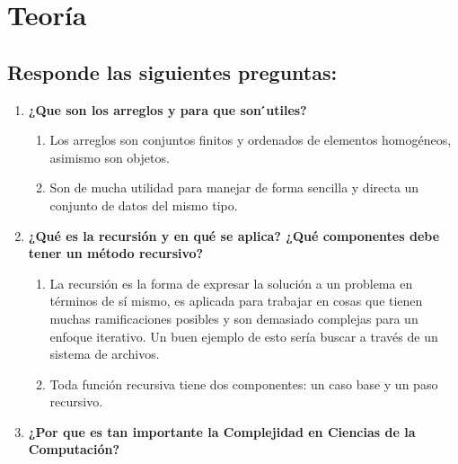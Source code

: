 \documentclass{report}
\begin{document}
\section*{Teoría}
\subsection*{Responde las siguientes preguntas:}
    \begin{enumerate}
	    \item \textbf{¿Que son los arreglos y para que son  ́utiles?}
	    	\begin{enumerate}
			\item Los arreglos son conjuntos finitos y ordenados de elementos homogéneos, asimismo son objetos.
            \item Son de mucha utilidad para manejar de forma sencilla y directa un conjunto de datos del mismo tipo. 
		    \end{enumerate}
	\item \textbf{¿Qué es la recursión y en qué se aplica? ¿Qué componentes debe tener un método recursivo?}
		\begin{enumerate}
			\item La recursión es la forma de expresar la solución a un problema en términos de sí mismo, es aplicada para trabajar en cosas que tienen muchas ramificaciones posibles y son demasiado complejas para un enfoque iterativo. Un buen ejemplo de esto sería buscar a través de un sistema de archivos. 
            \item Toda función recursiva tiene dos componentes: un caso base y un paso recursivo. 
		\end{enumerate}
	\item \textbf{¿Por que es tan importante la Complejidad en Ciencias de la Computación?}
\end{enumerate}
\end{document}
